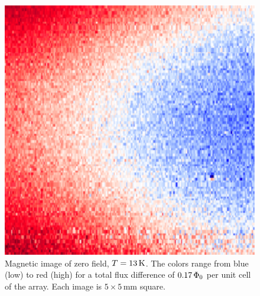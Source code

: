 \begin{figure}[p]
\includegraphics[width=5.7in]{figs/pme_exp/fig3_5_d_lg.ps}
\caption[Magnetic
image of zero field, $T=13\,\kelvin$.]{
Magnetic
image of zero field, $T=13\,\kelvin$. 
The colors range from blue (low) to red (high) for 
a total flux difference of $0.17\,\Phi_0$ per unit cell of the
array. Each image is $5\times 5\,\mathrm{mm}$ square.}
\label{fig:pme_scanning_passes_d}
\end{figure}


%
%

